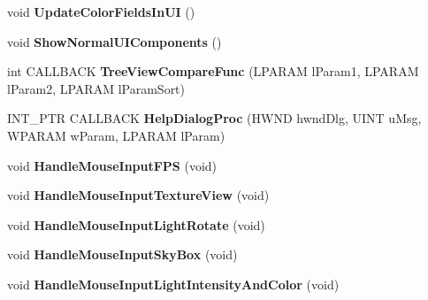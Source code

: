 \begin{DoxyCompactItemize}
\item 
\hypertarget{namespace_assimp_view_a0411436a4ce73d3e6ee06208cb733219}{void {\bfseries Update\+Color\+Fields\+In\+U\+I} ()}\label{namespace_assimp_view_a0411436a4ce73d3e6ee06208cb733219}

\item 
\hypertarget{namespace_assimp_view_a92d86f330de5e2884f7652d3acb9521c}{void {\bfseries Show\+Normal\+U\+I\+Components} ()}\label{namespace_assimp_view_a92d86f330de5e2884f7652d3acb9521c}

\item 
\hypertarget{namespace_assimp_view_aed07f86e96b4466a2d9c7a361f4ae683}{int C\+A\+L\+L\+B\+A\+C\+K {\bfseries Tree\+View\+Compare\+Func} (L\+P\+A\+R\+A\+M l\+Param1, L\+P\+A\+R\+A\+M l\+Param2, L\+P\+A\+R\+A\+M l\+Param\+Sort)}\label{namespace_assimp_view_aed07f86e96b4466a2d9c7a361f4ae683}

\item 
\hypertarget{namespace_assimp_view_a22e0e9f5e1f135f9c42400d52cf5928b}{I\+N\+T\+\_\+\+P\+T\+R C\+A\+L\+L\+B\+A\+C\+K {\bfseries Help\+Dialog\+Proc} (H\+W\+N\+D hwnd\+Dlg, U\+I\+N\+T u\+Msg, W\+P\+A\+R\+A\+M w\+Param, L\+P\+A\+R\+A\+M l\+Param)}\label{namespace_assimp_view_a22e0e9f5e1f135f9c42400d52cf5928b}

\item 
\hypertarget{namespace_assimp_view_aa4b5477ebed50aebc3ceddb134844d6d}{void {\bfseries Handle\+Mouse\+Input\+F\+P\+S} (void)}\label{namespace_assimp_view_aa4b5477ebed50aebc3ceddb134844d6d}

\item 
\hypertarget{namespace_assimp_view_aae417247e4e2534d534c7eb7976fecc9}{void {\bfseries Handle\+Mouse\+Input\+Texture\+View} (void)}\label{namespace_assimp_view_aae417247e4e2534d534c7eb7976fecc9}

\item 
\hypertarget{namespace_assimp_view_ae7b604e060f22bb3ad25b738dc7d3803}{void {\bfseries Handle\+Mouse\+Input\+Light\+Rotate} (void)}\label{namespace_assimp_view_ae7b604e060f22bb3ad25b738dc7d3803}

\item 
\hypertarget{namespace_assimp_view_aea655a1ef75dbe3360d0e266d048bc90}{void {\bfseries Handle\+Mouse\+Input\+Sky\+Box} (void)}\label{namespace_assimp_view_aea655a1ef75dbe3360d0e266d048bc90}

\item 
\hypertarget{namespace_assimp_view_a015051dbc8973223479b6374fc525fd9}{void {\bfseries Handle\+Mouse\+Input\+Light\+Intensity\+And\+Color} (void)}\label{namespace_assimp_view_a015051dbc8973223479b6374fc525fd9}


\end{DoxyCompactItemize}
